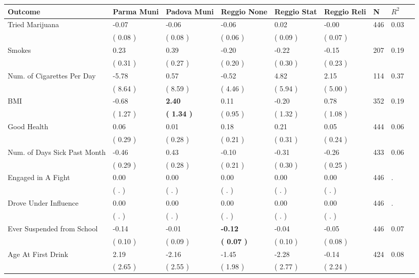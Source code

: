 \begin{tabular}{L{6.2cm} C{1.8cm} C{1.8cm} C{1.8cm} C{1.8cm} C{1.8cm} C{1.8cm} C{0.3cm} C{0.3cm}}
\toprule
 \textbf{Outcome} & \textbf{Parma Muni} & \textbf{Padova Muni} & \textbf{Reggio None} & \textbf{Reggio Stat} & \textbf{Reggio Reli} & \textbf{N} & \textbf{$ R^2$} \\
\midrule
Tried Marijuana &     -0.07 &     -0.06 &     -0.06 &      0.02 &     -0.00  & 446 &       0.03 \\ 
 & (     0.08 ) & (     0.08 ) & (     0.06 ) & (     0.09 ) & (     0.07 )  & \\
Smokes &      0.23 &      0.39 &     -0.20 &     -0.22 &     -0.15  & 207 &       0.19 \\ 
 & (     0.31 ) & (     0.27 ) & (     0.20 ) & (     0.30 ) & (     0.23 )  & \\
Num. of Cigarettes Per Day &     -5.78 &      0.57 &     -0.52 &      4.82 &      2.15  & 114 &       0.37 \\ 
 & (     8.64 ) & (     8.59 ) & (     4.46 ) & (     5.94 ) & (     5.00 )  & \\
BMI &     -0.68 & \textbf{     2.40} &      0.11 &     -0.20 &      0.78  & 352 &       0.19 \\ 
 & (     1.27 ) & \textbf{(     1.34 )} & (     0.95 ) & (     1.32 ) & (     1.08 )  & \\
Good Health &      0.06 &      0.01 &      0.18 &      0.21 &      0.05  & 444 &       0.06 \\ 
 & (     0.29 ) & (     0.28 ) & (     0.21 ) & (     0.31 ) & (     0.24 )  & \\
Num. of Days Sick Past Month &     -0.46 &      0.43 &     -0.10 &     -0.31 &     -0.26  & 433 &       0.06 \\ 
 & (     0.29 ) & (     0.28 ) & (     0.21 ) & (     0.30 ) & (     0.25 )  & \\
Engaged in A Fight &      0.00 &      0.00 &      0.00 &      0.00 &      0.00  & 446 &          . \\ 
 & (        . ) & (        . ) & (        . ) & (        . ) & (        . )  & \\
Drove Under Influence &      0.00 &      0.00 &      0.00 &      0.00 &      0.00  & 446 &          . \\ 
 & (        . ) & (        . ) & (        . ) & (        . ) & (        . )  & \\
Ever Suspended from School &     -0.14 &     -0.01 & \textbf{    -0.12} &     -0.04 &     -0.05  & 446 &       0.07 \\ 
 & (     0.10 ) & (     0.09 ) & \textbf{(     0.07 )} & (     0.10 ) & (     0.08 )  & \\
Age At First Drink &      2.19 &     -2.16 &     -1.45 &     -2.28 &     -0.14  & 424 &       0.08 \\ 
 & (     2.65 ) & (     2.55 ) & (     1.98 ) & (     2.77 ) & (     2.24 )  & \\
\bottomrule
\end{tabular}
